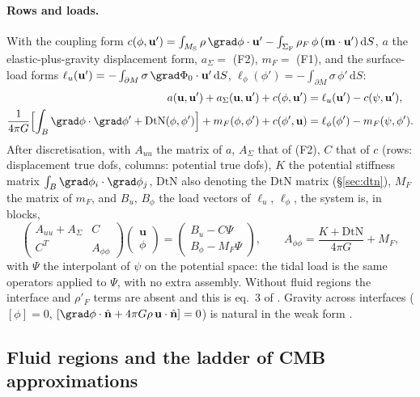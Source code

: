 \documentclass[11pt]{article}
\numberwithin{equation}{section}
\theoremstyle{remark}
\newcommand{\dS}{\,\mathrm{d}S}
\newcommand{\DtN}{\mathrm{DtN}}
\newcommand{\vu}{\mathbf{u}}
\newcommand{\vm}{\mathbf{m}}
\newcommand{\vn}{\hat{\mathbf{n}}}
\newcommand{\MS}{M_{\mathrm{S}}}
\newcommand{\SF}{\Sigma_{\mathrm{F}}}
\begin{document}
\paragraph{Rows and loads.} With the coupling form
$c(\phi,\vu') = \int_{\MS}\rho\,\grad\phi\cdot\vu' - \int_{\SF}\rho_F\,\phi\,
(\vm\cdot\vu')\dS$, $a$ the elastic-plus-gravity displacement form,
$a_\Sigma = $ (F2), $m_F = $ (F1), and the surface-load forms
$\ell_u(\vu') = -\int_{\partial M}\sigma\,\grad\Phi_0\cdot\vu'\dS$,
$\ell_\phi(\phi') = -\int_{\partial M}\sigma\,\phi'\dS$:
\begin{align}
  a(\vu,\vu') + a_\Sigma(\vu,\vu') + c(\phi,\vu') &= \ell_u(\vu') - c(\psi,\vu'),\\
  \frac{1}{4\pi G}\Bigl[\int_B\grad\phi\cdot\grad\phi' + \DtN(\phi,\phi')\Bigr]
   + m_F(\phi,\phi') + c(\phi',\vu) &= \ell_\phi(\phi') - m_F(\psi,\phi') .
\end{align}
After discretisation, with $A_{uu}$ the matrix of $a$, $A_\Sigma$ that of
(F2), $C$ that of $c$ (rows: displacement true dofs, columns: potential
true dofs), $K$ the potential stiffness matrix $\int_B\grad\phi_i\cdot
\grad\phi_j$, $\DtN$ also denoting the DtN matrix (\S\ref{sec:dtn}),
$M_F$ the matrix of $m_F$, and $B_u$, $B_\phi$ the load vectors of
$\ell_u$, $\ell_\phi$, the system is, in blocks,
\begin{equation}
  \begin{pmatrix} A_{uu} + A_\Sigma & C \\ C^T & A_{\phi\phi} \end{pmatrix}
  \begin{pmatrix} \vu \\ \phi \end{pmatrix}
  =
  \begin{pmatrix} B_u - C\Psi \\ B_\phi - M_F\Psi \end{pmatrix},
  \qquad
  A_{\phi\phi} = \frac{K + \DtN}{4\pi G} + M_F ,
  \label{eq:mixedblock}
\end{equation}
with $\Psi$ the interpolant of $\psi$ on the potential space: the tidal
load is the same operators applied to $\Psi$, with no extra assembly.
Without fluid regions the interface and $\rho'_F$ terms are absent and this
is eq.~3 of \cite{Yu2025}. Gravity across interfaces ($[\phi] = 0$,
$[\grad\phi\cdot\vn + 4\pi G\rho\,\vu\cdot\vn] = 0$) is natural in the
weak form \cite{WoodhouseDeuss2007}.

\subsection{Fluid regions and the ladder of CMB approximations}
\label{sec:cmb}
\end{document}
